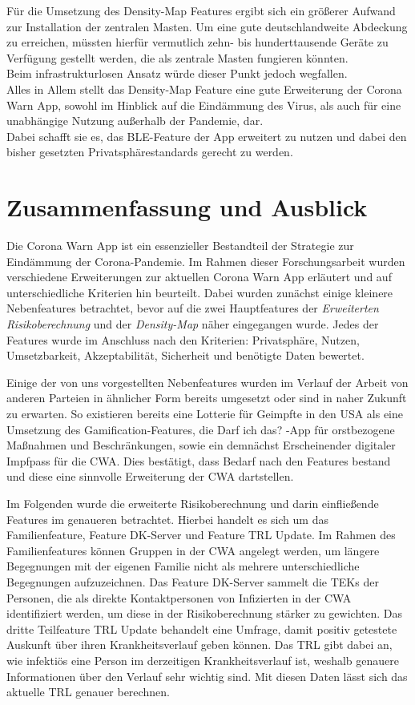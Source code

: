 \documentclass[conference,compsoc]{IEEEtran}
\begin{document}
Für die Umsetzung des Density-Map Features ergibt sich ein größerer Aufwand zur Installation der zentralen Masten. Um eine gute deutschlandweite Abdeckung zu erreichen, müssten hierfür vermutlich zehn- bis hunderttausende Geräte zu Verfügung gestellt werden, die als zentrale Masten fungieren könnten.\\
Beim infrastrukturlosen Ansatz würde dieser Punkt jedoch wegfallen.\\

Alles in Allem stellt das Density-Map Feature eine gute Erweiterung der Corona Warn App, sowohl im Hinblick auf die Eindämmung des Virus, als auch für eine unabhängige Nutzung außerhalb der Pandemie, dar.\\
Dabei schafft sie es, das BLE-Feature der App erweitert zu nutzen und dabei den bisher gesetzten Privatsphärestandards gerecht zu werden. 

\section{Zusammenfassung und Ausblick} \label{Conclusion}
Die Corona Warn App ist ein essenzieller Bestandteil der Strategie zur Eindämmung der Corona-Pandemie. 
Im Rahmen dieser Forschungsarbeit wurden verschiedene Erweiterungen zur aktuellen Corona Warn App erläutert und auf unterschiedliche Kriterien hin beurteilt. 
Dabei wurden zunächst einige kleinere Nebenfeatures betrachtet, bevor auf die zwei Hauptfeatures der \textit{Erweiterten Risikoberechnung} und der \textit{Density-Map} näher eingegangen wurde. 
Jedes der Features wurde im Anschluss nach den Kriterien: Privatsphäre, Nutzen, Umsetzbarkeit, Akzeptabilität, Sicherheit und benötigte Daten bewertet. 

Einige der von uns vorgestellten Nebenfeatures wurden im Verlauf der Arbeit von anderen Parteien in ähnlicher Form bereits umgesetzt oder sind in naher Zukunft zu erwarten.
So existieren bereits eine Lotterie für Geimpfte in den USA als eine Umsetzung des Gamification-Features, 
die \glqq Darf ich das? \grqq -App für orstbezogene Maßnahmen und Beschränkungen, 
sowie ein demnächst Erscheinender digitaler Impfpass für die CWA. 
Dies bestätigt, dass Bedarf nach den Features bestand und diese eine sinnvolle Erweiterung der CWA dartstellen.

Im Folgenden wurde die erweiterte Risikoberechnung und darin einfließende Features im genaueren betrachtet. 
Hierbei handelt es sich um das Familienfeature, Feature DK-Server und Feature TRL Update. 
Im Rahmen des Familienfeatures können Gruppen in der CWA angelegt werden, um längere Begegnungen mit der eigenen Familie nicht als mehrere unterschiedliche Begegnungen aufzuzeichnen. 
Das Feature DK-Server sammelt die TEKs der Personen, die als direkte Kontaktpersonen von Infizierten in der CWA identifiziert werden, um diese in der Risikoberechnung stärker zu gewichten. 
Das dritte Teilfeature TRL Update behandelt eine Umfrage, damit positiv getestete Auskunft über ihren Krankheitsverlauf geben können.
Das TRL gibt dabei an, wie infektiös eine Person im derzeitigen Krankheitsverlauf ist, weshalb genauere Informationen über den Verlauf sehr wichtig sind.
Mit diesen Daten lässt sich das aktuelle TRL genauer berechnen.
\end{document}
